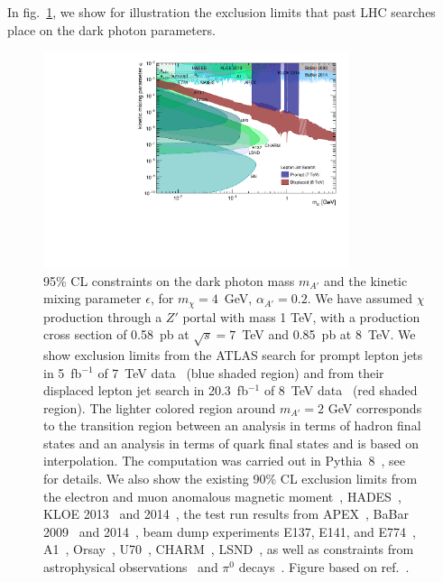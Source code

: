 In fig.~\ref{fig:radiating-dm-limits}, we show for
illustration the exclusion limits that past LHC searches place on the dark photon
parameters.

\begin{figure}
  \begin{center}
    \includegraphics[width=0.8\textwidth]{figures/DS_DarkPhoton_Constraints.pdf}
  \end{center}
  \vspace{-0.7cm}
  \caption{
    95\% CL constraints on the dark photon mass $m_{A'}$ and the kinetic mixing
    parameter $\epsilon$, for $m_\chi = 4$~GeV, $\alpha_{A'} = 0.2$.  We have
    assumed $\chi$ production through a $Z'$ portal with mass 1 TeV, with a production cross
    section of 0.58~pb at $\sqrt{s} = 7$~TeV and 0.85~pb at 8~TeV.
    We show exclusion limits from the ATLAS search for prompt lepton
    jets in 5~fb$^{-1}$ of 7~TeV data~\cite{Aad:2012qua} (blue shaded region)
    and from their displaced lepton jet search in 20.3~fb$^{-1}$ of 8~TeV
    data~\cite{Aad:2014yea} (red shaded region).
    The lighter colored region around $m_{A'}=2$ GeV corresponds to the
    transition region between an analysis in terms of hadron final states and
    an analysis in terms of quark final states and is based on interpolation.
    The computation was carried out in Pythia~8~\cite{Carloni:2010tw,
    Carloni:2011kk, Sjostrand:2014zea}, see~\cite{Buschmann:2015awa} for
    details.  We also show the existing 90\% CL exclusion limits from the
    electron and muon anomalous magnetic
    moment~\cite{Pospelov:2008zw,Davoudiasl:2012ig,Endo:2012hp},
    HADES~\cite{Agakishiev:2013fwl}, KLOE 2013~\cite{Babusci:2012cr} and
    2014~\cite{Babusci:2014sta}, the test run results from
    APEX~\cite{Abrahamyan:2011gv}, BaBar 2009~\cite{Aubert:2009cp} and
    2014~\cite{Lees:2014xha}, beam dump experiments E137, E141, and
    E774~\cite{Blumlein:2011mv,Bjorken:2009mm,Bross:1989mp},
    A1~\cite{Merkel:2011ze}, Orsay~\cite{Davier:1989wz},
    U70~\cite{Blumlein:2013cua}, CHARM~\cite{Gninenko:2012eq},
    LSND~\cite{Essig:2010gu}, as well as constraints from astrophysical
    observations~\cite{Dent:2012mx,Dreiner:2013mua} and $\pi^0$
    decays~\cite{CERNNA48/2:2015lha}. Figure based on
    ref.~\cite{Buschmann:2015awa}.}
  \label{fig:radiating-dm-limits}
\end{figure}





